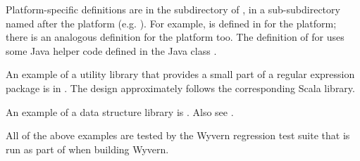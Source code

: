 \documentclass{article}
\begin{document}
Platform-specific definitions are in the  subdirectory of , in a sub-subdirectory named after the platform (e.g. ).
For example,  is defined in  for the  platform; there is an analogous definition for the  platform too.  The definition of  for  uses some Java helper code defined in the Java class .%

An example of a utility library that provides a small part of a regular expression package is in .  The design approximately follows the corresponding Scala library.%

An example of a data structure library is .  Also see .%

All of the above examples are tested by the Wyvern regression test suite that is run as part of  when building Wyvern.%
\end{document}
